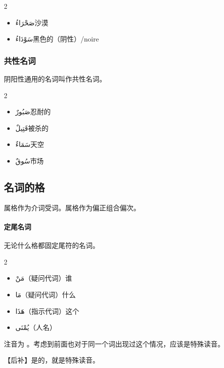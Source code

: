 \begin{multicols}{2}
    \begin{itemize}
        \item \ac{صَحْرَاءُ}{沙漠}
        \item \ac{سَوْدَاءُ}{黑色的（阴性）/noire}
    \end{itemize}
\end{multicols}

\subsubsection{共性名词}

阴阳性通用的名词叫作共性名词。

\begin{multicols}{2}
    \begin{itemize}
        \item \ac{صَبُورٌ}{忍耐的}
        \item \ac{قَتِيلٌ}{被杀的}
        \item \ac{سَمَاءٌ}{天空}
        \item \ac{سُوقٌ}{市场}
    \end{itemize}
\end{multicols}

\subsection{ 名词的格}

属格作为介词受词。属格作为偏正组合偏次。

\paragraph{定尾名词} 无论什么格都固定尾符的名词。

\begin{multicols}{2}
    \begin{itemize}
        \item \ac{مَنْ}{（疑问代词）谁}
        \item \ac{مَا}{（疑问代词）什么}
        \item \ac{هَذَا}{（指示代词）这个}
        \item \ac{يُمْنَى}{（人名）}
    \end{itemize}
\end{multicols}

\begin{note}
     注音为  。考虑到前面也对于同一个词出现过这个情况，应该是特殊读音。

    【后补】是的，就是特殊读音。
\end{note}

